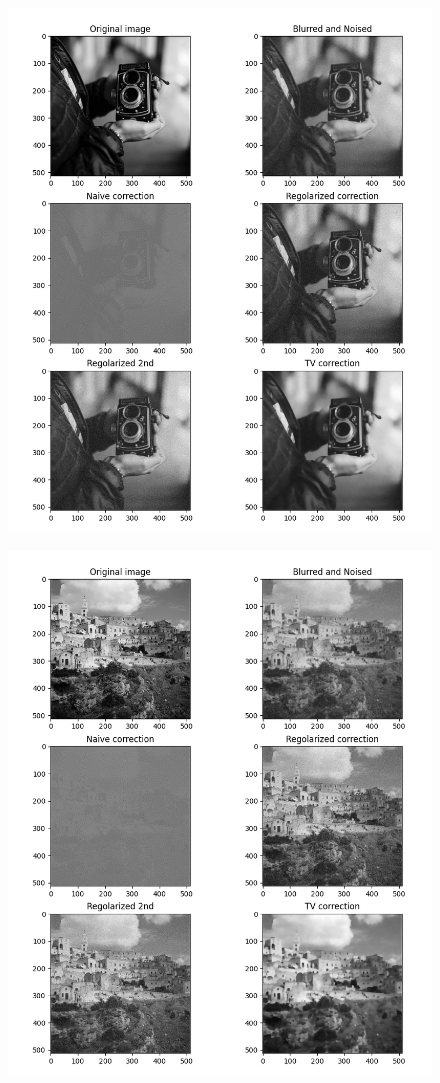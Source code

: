 \documentclass[12pt]{article}
\begin{document}
    \begin{figure}[h!]
    \centering
    \includegraphics[width=14cm]{sample9}
    \end{figure}
    \newpage

    \begin{figure}[h!]
    \centering
    \includegraphics[width=14cm]{sample10}
    \end{figure}
    \newpage
\end{document}
